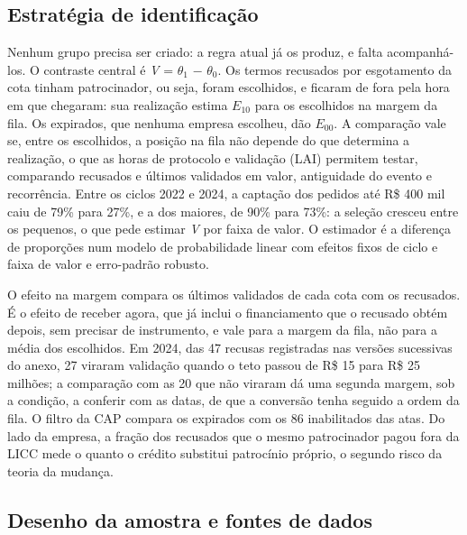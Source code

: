 \documentclass[12pt,a4paper]{article}
\begin{document}
\subsection{Estratégia de identificação}\label{secao-5.2}

Nenhum grupo precisa ser criado: a regra atual já os produz, e falta acompanhá-los. O contraste
central é \emph{V} = \(\theta_1\) − \(\theta_0\). Os termos recusados por esgotamento da cota tinham
patrocinador, ou seja, foram escolhidos, e ficaram de fora pela hora em que chegaram: sua realização
estima \(E_{10}\) para os escolhidos na margem da fila. Os expirados, que nenhuma empresa escolheu,
dão \(E_{00}\). A comparação vale se, entre os escolhidos, a posição na fila não depende do que
determina a realização, o que as horas de protocolo e validação (LAI) permitem testar, comparando
recusados e últimos validados em valor, antiguidade do evento e recorrência. Entre os ciclos 2022 e
2024, a captação dos pedidos até R\$ 400 mil caiu de 79\% para 27\%, e a dos maiores, de 90\% para
73\%: a seleção cresceu entre os pequenos, o que pede estimar \emph{V} por faixa de valor. O
estimador é a diferença de proporções num modelo de probabilidade linear com efeitos fixos de ciclo
e faixa de valor e erro-padrão robusto.

O efeito na margem compara os últimos validados de cada cota com os recusados. É o efeito de receber
agora, que já inclui o financiamento que o recusado obtém depois, sem precisar de instrumento, e
vale para a margem da fila, não para a média dos escolhidos. Em 2024, das 47 recusas registradas nas
versões sucessivas do anexo, 27 viraram validação quando o teto passou de R\$ 15 para R\$ 25
milhões; a comparação com as 20 que não viraram dá uma segunda margem, sob a condição, a conferir
com as datas, de que a conversão tenha seguido a ordem da fila. O filtro da CAP compara os expirados
com os 86 inabilitados das atas. Do lado da empresa, a fração dos recusados que o mesmo patrocinador
pagou fora da LICC mede o quanto o crédito substitui patrocínio próprio, o segundo risco da teoria
da mudança.

\subsection{Desenho da amostra e fontes de dados}\label{secao-5.3}
\end{document}
